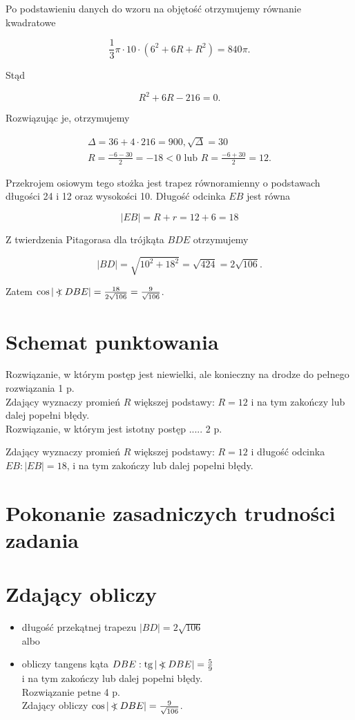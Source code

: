 \documentclass[10pt]{article}
\newcommand\Varangle{\mathop{{<\!\!\!\!\!\text{\small)}}\:}\nolimits}
\begin{document}
Po podstawieniu danych do wzoru na objętość otrzymujemy równanie kwadratowe

$$
\frac{1}{3} \pi \cdot 10 \cdot\left(6^{2}+6 R+R^{2}\right)=840 \pi .
$$

Stąd

$$
R^{2}+6 R-216=0 .
$$

Rozwiązując je, otrzymujemy

$$
\begin{gathered}
\Delta=36+4 \cdot 216=900, \sqrt{\Delta}=30 \\
R=\frac{-6-30}{2}=-18<0 \text { lub } R=\frac{-6+30}{2}=12 .
\end{gathered}
$$

Przekrojem osiowym tego stożka jest trapez równoramienny o podstawach długości 24 i 12 oraz wysokości 10. Długość odcinka $E B$ jest równa

$$
|E B|=R+r=12+6=18
$$

Z twierdzenia Pitagorasa dla trójkąta $B D E$ otrzymujemy

$$
|B D|=\sqrt{10^{2}+18^{2}}=\sqrt{424}=2 \sqrt{106} .
$$

Zatem $\cos |\Varangle D B E|=\frac{18}{2 \sqrt{106}}=\frac{9}{\sqrt{106}}$.

\section*{Schemat punktowania}
Rozwiązanie, w którym postęp jest niewielki, ale konieczny na drodze do pełnego rozwiązania 1 p.\\
Zdający wyznaczy promień $R$ większej podstawy: $R=12$ i na tym zakończy lub dalej popełni błędy.\\
Rozwiązanie, w którym jest istotny postęp ..... 2 p.

Zdający wyznaczy promień $R$ większej podstawy: $R=12$ i długość odcinka $E B:|E B|=18$, i na tym zakończy lub dalej popełni błędy.

\section*{Pokonanie zasadniczych trudności zadania}
\section*{Zdający obliczy}
\begin{itemize}
  \item długość przekątnej trapezu $|B D|=2 \sqrt{106}$\\
albo
  \item obliczy tangens kąta $D B E: \operatorname{tg}|\Varangle D B E|=\frac{5}{9}$\\
i na tym zakończy lub dalej popełni błędy.\\
Rozwiązanie petne 4 p.\\
Zdający obliczy $\cos |\Varangle D B E|=\frac{9}{\sqrt{106}}$.
\end{itemize}
\end{document}
